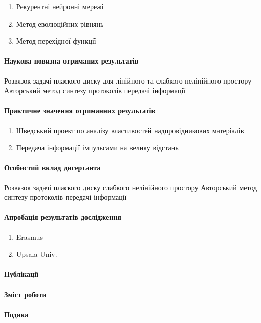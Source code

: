 \begin{enumerate} 
	\item Рекурентні нейронні мережі
	\item Метод еволюційних рівнянь
	\item Метод перехідної функції
\end{enumerate} 

\paragraph{Наукова новизна отриманих результатів}

Розвязок задачі плаского диску для лінійного та слабкого нелінійного простору
Авторський метод синтезу протоколів передачі інформації

\paragraph{Практичне значення отриманних результатів}

\begin{enumerate} 
	\item Шведський проект по аналізу властивостей надпровідникових матеріалів
	\item Передача інформації імпульсами на велику відстань
\end{enumerate} 

\paragraph{Особистий вклад дисертанта}

Розвязок задачі плаского диску слабкого нелінійного простору
Авторський метод синтезу протоколів передачі інформації

\paragraph{Апробація результатів дослідження}

\begin{enumerate} 
	\item Erasmus+
	\item Upsala Univ.
\end{enumerate} 

\paragraph{Публікації}

\paragraph{Зміст роботи}

\paragraph{Подяка}
